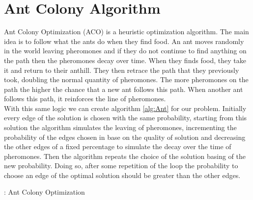 \section{Ant Colony Algorithm}
Ant Colony Optimization (ACO) is a heuristic optimization algorithm. The main idea is to follow what the ants do when they find food. An ant moves randomly in the world leaving pheromones and if they do not continue to find anything on the path then the pheromones decay over time. When they finds food, they take it and return to their anthill. They then retrace the path that they previously took, doubling the normal quantity of pheromones. The more pheromones on the path the higher the chance that a new ant follows this path. When another ant follows this path, it reinforces the line of pheromones.\\
With this same logic we can create algorithm \ref{alg:Ant} for our problem. Initially every edge of the solution is chosen with the same probability, starting from this solution the algorithm simulates the leaving of pheromones, incrementing the probability of the edges chosen in base on the quality of solution and decreasing the other edges of a fixed percentage to simulate the decay over the time of pheromones. Then the algorithm repeats the choice of the solution basing of the new probability. Doing so, after some repetition of the loop the probability to choose an edge of the optimal solution should be greater than the other edges.\\

\begin{algorithm}
\caption{: Ant Colony Optimization} \label{alg:Ant}
\begin{algorithmic} 
\REPEAT
{}
\end{algorithmic}
\end{algorithm}

